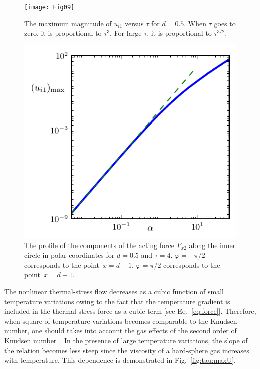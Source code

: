 \documentclass[smallextended, referee]{svjour3} %
\begin{document}
\begin{figure}[ht]
    \centering
    \begin{minipage}{.48\textwidth}
        \centering
        \texttt{[image: Fig09]}
        \caption{The maximum magnitude of \(u_{i1}\) versus \(\tau\) for \(d=0.5\).
                When \(\tau\) goes to zero, it is proportional to \(\tau^3\).
                For large \(\tau\), it is proportional to \(\tau^{3/2}\).}
        \label{fig:tau:maxU}
    \end{minipage}
    \quad
    \begin{minipage}{.48\textwidth}
        \centering
        \includegraphics{Fig10}
        \caption{The profile of the components of the acting force \(F_{x2}\) along
                the inner circle in polar coordinates for \(d=0.5\) and \(\tau=4\).
                \(\varphi = -\pi/2\) corresponds to the point~\(x=d-1\),
                \(\varphi = \pi/2\) corresponds to the point~\(x=d+1\).}
        \label{fig:terms:inner}
    \end{minipage}
\end{figure}

The nonlinear thermal-stress flow decreases as a cubic function of small temperature variations
owing to the fact that the temperature gradient is included in the thermal-stress force
as a cubic term [see Eq.~\eqref{eq:force}].
Therefore, when square of temperature variations becomes comparable to the Knudsen number,
one should takes into account the gas effects of the second order of Knudsen number~\cite{Sone1989Noncoaxial}.
In the presence of large temperature variations,
the slope of the relation becomes less steep since the viscosity of a hard-sphere gas increases with temperature.
This dependence is demonstrated in Fig.~\ref{fig:tau:maxU}.
\end{document}
